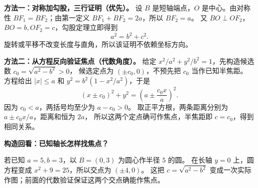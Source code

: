 \begin{proofbox}
\textbf{方法一：对称加勾股，三行证明（优先）。}
设 $B$ 是短轴端点，$O$ 是中心。由对称性 $BF_1=BF_2$；由第一定义
$BF_1+BF_2=2a$，所以 $BF_2=a$。
又 $BO\perp OF_2$，$BO=b,OF_2=c$，勾股定理立即得到
\[
\boxed{a^2=b^2+c^2}.
\]
旋转或平移不改变长度与直角，所以该证明不依赖坐标方向。

\textbf{方法二：从方程反向验证焦点（代数角度）。}
给定 $x^2/a^2+y^2/b^2=1$，先构造候选数 $c_0=\sqrt{a^2-b^2}>0$，
候选定点为 $(\pm c_0,0)$，不预先把 $c_0$ 当作已知半焦距。
方程给出 $|x|\le a$ 和 $y^2=b^2(1-x^2/a^2)$，于是
\[
(x\pm c_0)^2+y^2=\left(a\pm\frac{c_0x}{a}\right)^2.
\]
因为 $c_0<a$，两括号均至少为 $a-c_0>0$。
取正平方根，两条距离分别为 $a\pm c_0x/a$，距离和恒为 $2a$，
所以这两个定点确可作焦点，半焦距即 $c=c_0$，得到相同关系。
\end{proofbox}
\clearpage
\begin{proofbox}
\textbf{构造回看：已知轴长怎样找焦点？}

若已知 $a=5,b=3$，以 $B=(0,3)$ 为圆心作半径 $5$ 的圆。
在长轴 $y=0$ 上，圆方程变成 $x^2+9=25$，所以交点为 $(\pm4,0)$。
这把 $c=\sqrt{a^2-b^2}$ 变成一次实际作图；前面的代数验证保证这两个交点确能作焦点。
\end{proofbox}
